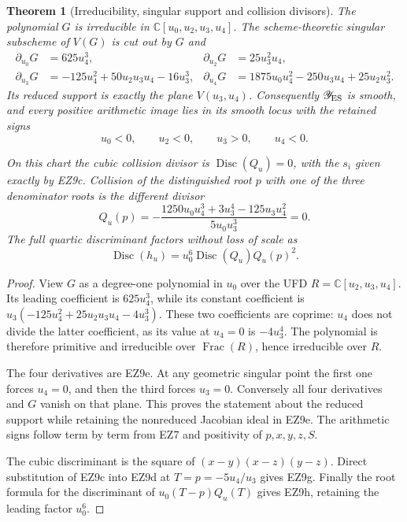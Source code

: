 \documentclass[11pt]{article}
\newtheorem{theorem}{Theorem}[section]
\theoremstyle{definition}\newtheorem{definition}[theorem]{Definition}
\theoremstyle{remark}\newtheorem{remark}[theorem]{Remark}
\newcommand{\Disc}{\operatorname{Disc}}
\newcommand{\Frac}{\operatorname{Frac}}
\begin{document}
\begin{theorem}[Irreducibility, singular support and collision divisors]
The polynomial \(G\) is irreducible in
\(\mathbb C[u_0,u_2,u_3,u_4]\).  The scheme-theoretic singular subscheme
of \(V(G)\) is cut out by \(G\) and
\begin{align}
 \partial_{u_0}G&=625u_4^3,&
 \partial_{u_2}G&=25u_3^2u_4,\nonumber\\
 \partial_{u_3}G&=-125u_4^2+50u_2u_3u_4-16u_3^3,&
 \partial_{u_4}G&=1875u_0u_4^2-250u_3u_4+25u_2u_3^2.
                                                               \tag{EZ9e}
\end{align}
Its reduced support is exactly the plane
\(V(u_3,u_4)\).  Consequently \(\mathscr Y_{\rm ES}\) is smooth, and
every positive arithmetic image lies in its smooth locus with the retained
signs
\begin{equation}
 u_0<0,\qquad u_2<0,\qquad u_3>0,\qquad u_4<0.          \tag{EZ9f}
\end{equation}

On this chart the cubic collision divisor is \(\Disc(Q_u)=0\), with the
\(s_i\) given exactly by EZ9c.  Collision of the distinguished root \(p\)
with one of the three denominator roots is the different divisor
\begin{equation}
 Q_u(p)=-\frac{1250u_0u_4^3+3u_3^4-125u_3u_4^2}
                    {5u_0u_3^3}=0.                    \tag{EZ9g}
\end{equation}
The full quartic discriminant factors without loss of scale as
\begin{equation}
 \Disc(h_u)=u_0^6\Disc(Q_u)Q_u(p)^2.                  \tag{EZ9h}
\end{equation}
\end{theorem}

\begin{proof}
View \(G\) as a degree-one polynomial in \(u_0\) over the UFD
\(R=\mathbb C[u_2,u_3,u_4]\).  Its leading coefficient is
\(625u_4^3\), while its constant coefficient is
\(u_3(-125u_4^2+25u_2u_3u_4-4u_3^3)\).  These two coefficients are
coprime: \(u_4\) does not divide the latter coefficient, as its value at
\(u_4=0\) is \(-4u_3^4\).  The polynomial is therefore primitive and
irreducible over \(\Frac(R)\), hence irreducible over \(R\).

The four derivatives are EZ9e.  At any geometric singular point the first
one forces \(u_4=0\), and then the third forces \(u_3=0\).  Conversely all
four derivatives and \(G\) vanish on that plane.  This proves the statement
about the reduced support while retaining the nonreduced Jacobian ideal in
EZ9e.  The arithmetic signs follow term by term from EZ7 and positivity of
\(p,x,y,z,S\).

The cubic discriminant is the square of
\((x-y)(x-z)(y-z)\).  Direct substitution of EZ9c into EZ9d at
\(T=p=-5u_4/u_3\) gives EZ9g.  Finally the root formula for the discriminant
of \(u_0(T-p)Q_u(T)\) gives EZ9h, retaining the leading factor \(u_0^6\).
\end{proof}
\end{document}
